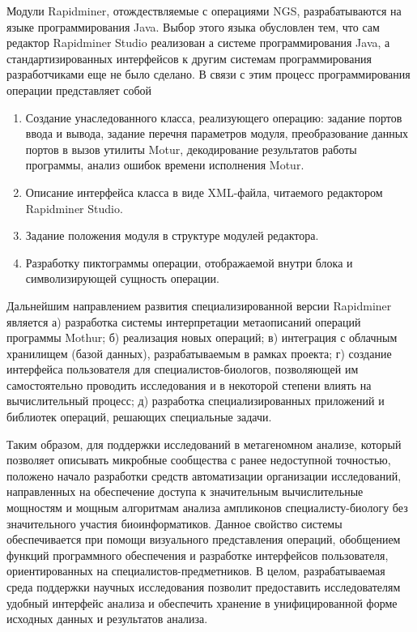\documentclass[a4paper,12pt,openany,final]{extreport}
\begin{document}
Модули Rapidminer, отождествляемые с операциями NGS, разрабатываются на
языке программирования Java. Выбор этого языка обусловлен тем, что сам
редактор Rapidminer Studio реализован а системе программирования Java, а
стандартизированных интерфейсов к другим системам программирования
разработчиками еще не было сделано. В связи с этим процесс
программирования операции представляет собой

\begin{enumerate}
\def\labelenumi{\arabic{enumi}.}
\item
  Создание унаследованного класса, реализующего операцию: задание портов
  ввода и вывода, задание перечня параметров модуля, преобразование
  данных портов в вызов утилиты Motur, декодирование результатов работы
  программы, анализ ошибок времени исполнения Motur.
\item
  Описание интерфейса класса в виде XML-файла, читаемого редактором
  Rapidminer Studio.
\item
  Задание положения модуля в структуре модулей редактора.
\item
  Разработку пиктограммы операции, отображаемой внутри блока и
  символизирующей сущность операции.
\end{enumerate}

Дальнейшим направлением развития специализированной версии Rapidminer
является а) разработка системы интерпретации метаописаний операций
программы Mothur; б) реализация новых операций; в) интеграция с облачным
хранилищем (базой данных), разрабатываемым в рамках проекта; г) создание
интерфейса пользователя для специалистов-биологов, позволяющей им
самостоятельно проводить исследования и в некоторой степени влиять на
вычислительный процесс; д) разработка специализированных приложений и
библиотек операций, решающих специальные задачи.

Таким образом, для поддержки исследований в метагеномном анализе,
который позволяет описывать микробные сообщества с ранее недоступной
точностью, положено начало разработки средств автоматизации организации
исследований, направленных на обеспечение доступа к значительным
вычислительные мощностям и мощным алгоритмам анализа ампликонов
специалисту-биологу без значительного участия биоинформатиков. Данное
свойство системы обеспечивается при помощи визуального представления
операций, обобщением функций программного обеспечения и разработке
интерфейсов пользователя, ориентированных на специалистов-предметников.
В целом, разрабатываемая среда поддержки научных исследования позволит
предоставить исследователям удобный интерфейс анализа и обеспечить
хранение в унифицированной форме исходных данных и результатов анализа.
\end{document}
